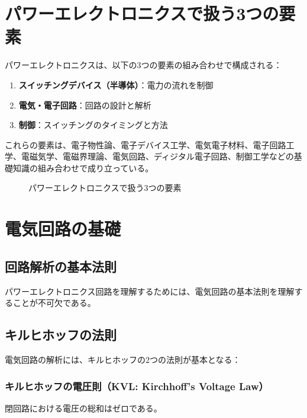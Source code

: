 \section{パワーエレクトロニクスで扱う3つの要素}

パワーエレクトロニクスは、以下の3つの要素の組み合わせで構成される：

\begin{enumerate}
\item \textbf{スイッチングデバイス（半導体）}：電力の流れを制御
\item \textbf{電気・電子回路}：回路の設計と解析
\item \textbf{制御}：スイッチングのタイミングと方法
\end{enumerate}

これらの要素は、電子物性論、電子デバイス工学、電気電子材料、電子回路工学、電磁気学、電磁界理論、電気回路、ディジタル電子回路、制御工学などの基礎知識の組み合わせで成り立っている。

\begin{figure}[H]
\centering
{}
\caption{パワーエレクトロニクスで扱う3つの要素}
\label{fig:three_elements}
\end{figure}

\section{電気回路の基礎}

\subsection{回路解析の基本法則}

パワーエレクトロニクス回路を理解するためには、電気回路の基本法則を理解することが不可欠である。

\subsection{キルヒホッフの法則}

電気回路の解析には、キルヒホッフの2つの法則が基本となる：

\subsubsection{キルヒホッフの電圧則（KVL: Kirchhoff's Voltage Law）}

閉回路における電圧の総和はゼロである。


